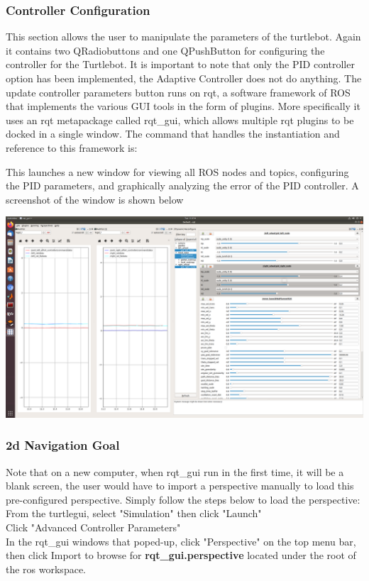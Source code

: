 \documentclass[12]{article}
\begin{document}
\subsubsection{Controller Configuration}
This section allows the user to manipulate the parameters of the turtlebot. Again it contains two QRadiobuttons and one QPushButton for configuring the controller for the Turtlebot. It is important to note that only the PID controller option has been implemented, the Adaptive Controller does not do anything. The update controller parameters button runs on rqt, a software framework of ROS that implements the various GUI tools in the form of plugins. More specifically it uses an rqt metapackage called rqt\_gui, which allows multiple rqt plugins to be docked in a single window. The command that handles the instantiation and reference to this framework is:

This launches a new window for viewing all ROS nodes and topics, configuring the PID parameters, and graphically analyzing the error of the PID controller. 
A screenshot of the window is shown below
\begin{center}
\includegraphics[width=0.9\linewidth]{images/rqt_gui.png} \\
\end{center}

\subsubsection{2d Navigation Goal}

Note that on a new computer, when rqt\_gui run in the first time, it will be a blank screen, 
the user would have to import a perspective manually to load this pre-configured perspective.
Simply follow the steps below to load the perspective: \\
From the turtlegui, select "Simulation" then click "Launch"\\
Click "Advanced Controller Parameters"\\
In the rqt\_gui windows that poped-up, click "Perspective" on the top menu bar, 
then click Import to browse for \textbf{rqt\_gui.perspective} located under the root of the ros workspace. \\
\end{document}
